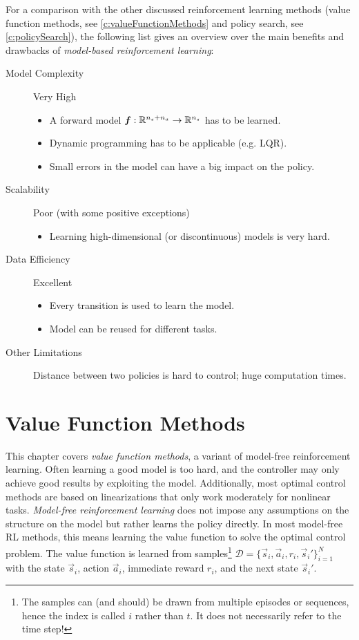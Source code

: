 		For a comparison with the other discussed reinforcement learning methods (value function methods, see \autoref{c:valueFunctionMethods} and policy search, see \autoref{c:policySearch}), the following list gives an overview over the main benefits and drawbacks of \emph{model-based reinforcement learning}:
		\begin{description}
			\item[Model Complexity] Very High
				\begin{itemize}
					\item A forward model \( \bm{f} : \mathbb{R}^{n_s + n_a} \to \mathbb{R}^{n_s} \) has to be learned.
					\item Dynamic programming has to be applicable (e.g. LQR).
					\item Small errors in the model can have a big impact on the policy.
				\end{itemize}
			\item[Scalability] Poor (with some positive exceptions)
				\begin{itemize}
					\item Learning high-dimensional (or discontinuous) models is very hard.
				\end{itemize}
			\item[Data Efficiency] Excellent
				\begin{itemize}
					\item Every transition is used to learn the model.
					\item Model can be reused for different tasks.
				\end{itemize}
			\item[Other Limitations] Distance between two policies is hard to control; huge computation times.
		\end{description}

\chapter{Value Function Methods}
	\label{c:valueFunctionMethods}

	This chapter covers \emph{value function methods}, a variant of model-free reinforcement learning. Often learning a good model is too hard, and the controller may only achieve good results by exploiting the model. Additionally, most optimal control methods are based on linearizations that only work moderately for nonlinear tasks. \emph{Model-free reinforcement learning} does not impose any assumptions on the structure on the model but rather learns the policy directly. In most model-free RL methods, this means learning the value function to solve the optimal control problem. The value function is learned from samples\footnote{The samples can (and should) be drawn from multiple episodes or sequences, hence the index is called \(i\) rather than \(t\). It does not necessarily refer to the time step!} \( \mathcal{D} = \big\{ \vec{s}_i, \vec{a}_i, r_i, \vec{s}_i' \}_{i = 1}^{N} \) with the state \(\vec{s}_i\), action \(\vec{a}_i\), immediate reward \(r_i\), and the next state \(\vec{s}_i'\).

